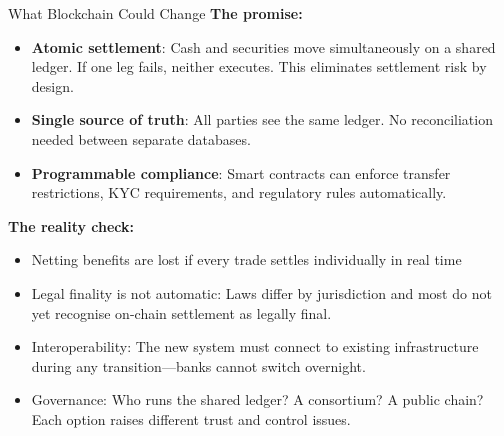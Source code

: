 \documentclass[10pt]{beamer}
\newcommand{\bad}[1]{\textcolor{AccentOrange}{#1}}
\begin{document}
\begin{frame}{What Blockchain Could Change}
  \textbf{The promise:}
  \begin{itemize}
    \item \textbf{Atomic settlement}: Cash and securities move simultaneously on a shared ledger. If one leg fails, neither executes. This eliminates settlement risk by design.
    \item \textbf{Single source of truth}: All parties see the same ledger. No reconciliation needed between separate databases.
    \item \textbf{Programmable compliance}: Smart contracts can enforce transfer restrictions, KYC requirements, and regulatory rules automatically.
  \end{itemize}
  
  \vspace{0.5em}
  \textbf{The reality check:}
  \begin{itemize}
    \item \bad{Netting benefits are lost} if every trade settles individually in real time
    \item \bad{Legal finality} is not automatic: Laws differ by jurisdiction and most do not yet recognise on-chain settlement as legally final.
    \item \bad{Interoperability}: The new system must connect to existing infrastructure during any transition---banks cannot switch overnight.
    \item \bad{Governance}: Who runs the shared ledger? A consortium? A public chain? Each option raises different trust and control issues.
  \end{itemize}
\end{frame}
\end{document}
